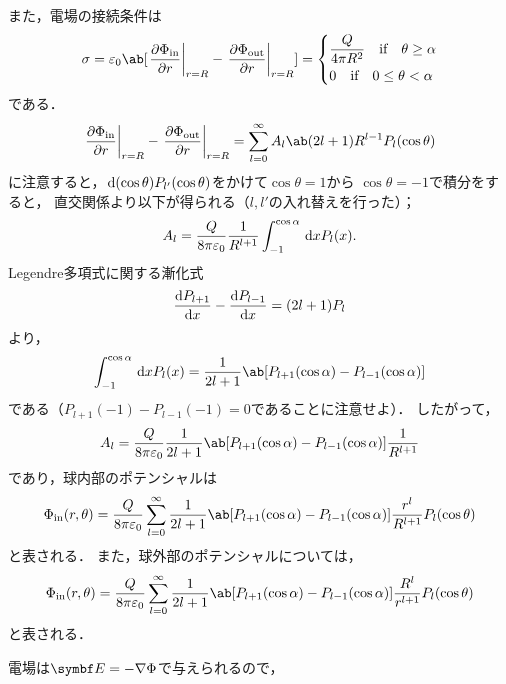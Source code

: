 また，電場の接続条件は
\begin{gather}%
  \sigma = \eps_0 \ab[\eval{\diffp{\Phi_{\text{in}}}{r}}_{r=R} -
  \eval{\diffp{\Phi_{\text{out}}}{r}}_{r=R}] 
  =
  \begin{dcases}%
    \frac{Q}{4\pi R^2} \qqtext{if} \theta \geq \alpha\\
    0 \qqtext{if} 0 \leq \theta < \alpha
  \end{dcases}%
\end{gather}%
である．
\begin{gather}%
  \eval{\diffp{\Phi_{\text{in}}}{r}}_{r=R}
  - \eval{\diffp{\Phi_{\text{out}}}{r}}_{r=R} 
  = \sum_{l=0}^\infty A_l \ab(2l+1) R^{l-1} P_l(\cos\theta)
\end{gather}%
に注意すると，$\dl{(\cos\theta)}P_{l'}(\cos\theta)$をかけて$\cos\theta =1$から
$\cos\theta = -1$で積分をすると，
直交関係より以下が得られる（$l,l'$の入れ替えを行った）；
\begin{gather}%
  A_l = \frac{Q}{8\pi \eps_0}\frac{1}{R^{l+1}} \int_{-1}^{\cos\alpha} \dl{x} P_l(x).
\end{gather}%
Legendre多項式に関する漸化式
\begin{gather}%
  \diff{P_{l+1}}{x} - \diff{P_{l-1}}{x} = (2l+1)P_l
\end{gather}%
より，
\begin{gather}%
  \int_{-1}^{\cos\alpha} \dl{x} P_l(x) 
  = \frac{1}{2l+1}\ab[P_{l+1}(\cos\alpha) - P_{l-1}(\cos\alpha)]
\end{gather}%
である（$P_{l+1}(-1) - P_{l-1}(-1) = 0$であることに注意せよ）．
したがって，
\begin{gather}%
  A_l = \frac{Q}{8\pi \eps_0} \frac{1}{2l+1} \ab[P_{l+1}(\cos\alpha) - P_{l-1}(\cos\alpha)]\frac{1}{R^{l+1}}
\end{gather}%
であり，球内部のポテンシャルは
\begin{gather}%
  \Phi_{\text{in}}(r,\theta) = \frac{Q}{8\pi \eps_0} \sum_{l=0}^\infty \frac{1}{2l+1}
  \ab[P_{l+1}(\cos\alpha) - P_{l-1}(\cos\alpha)] \frac{r^l}{R^{l+1}} P_l(\cos\theta)
\end{gather}%
と表される．
また，球外部のポテンシャルについては，
\begin{gather}%
  \Phi_{\text{in}}(r,\theta) = \frac{Q}{8\pi \eps_0} \sum_{l=0}^\infty \frac{1}{2l+1}
  \ab[P_{l+1}(\cos\alpha) - P_{l-1}(\cos\alpha)] \frac{R^l}{r^{l+1}} P_l(\cos\theta)
\end{gather}%
と表される．

電場は$\bs{E} = -\gr \Phi$で与えられるので，


